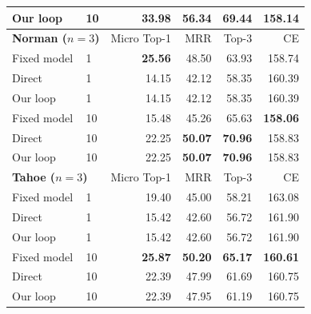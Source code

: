 \begin{longtable}{llrrrr}
Our loop & 10 & \textbf{33.98} & 56.34 & 69.44 & 158.14 \\
\midrule
\multicolumn{2}{l}{\textbf{Norman ($n=3$)}} & Micro Top-1 & MRR & Top-3 & CE \\
Fixed model & 1 & \textbf{25.56} & 48.50 & 63.93 & 158.74 \\
Direct & 1 & 14.15 & 42.12 & 58.35 & 160.39 \\
Our loop & 1 & 14.15 & 42.12 & 58.35 & 160.39 \\
Fixed model & 10 & 15.48 & 45.26 & 65.63 & \textbf{158.06} \\
Direct & 10 & 22.25 & \textbf{50.07} & \textbf{70.96} & 158.83 \\
Our loop & 10 & 22.25 & \textbf{50.07} & \textbf{70.96} & 158.83 \\
\midrule
\multicolumn{2}{l}{\textbf{Tahoe ($n=3$)}} & Micro Top-1 & MRR & Top-3 & CE \\
Fixed model & 1 & 19.40 & 45.00 & 58.21 & 163.08 \\
Direct & 1 & 15.42 & 42.60 & 56.72 & 161.90 \\
Our loop & 1 & 15.42 & 42.60 & 56.72 & 161.90 \\
Fixed model & 10 & \textbf{25.87} & \textbf{50.20} & \textbf{65.17} & \textbf{160.61} \\
Direct & 10 & 22.39 & 47.99 & 61.69 & 160.75 \\
Our loop & 10 & 22.39 & 47.95 & 61.19 & 160.75 \\
\midrule
\bottomrule
\end{longtable}
